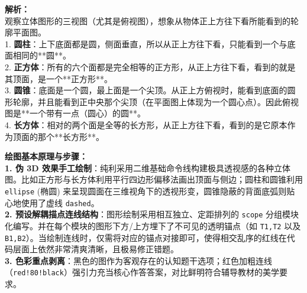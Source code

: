 \begin{center}
\end{center}

\vspace{0.8cm}

{\small\color{gray}
\textbf{解析：}\\
观察立体图形的三视图（尤其是俯视图），想象从物体正上方往下看所能看到的轮廓平面图。\\
1. \textbf{圆柱}：上下底面都是圆，侧面垂直，所以从正上方往下看，只能看到一个与底面相同的**圆**。\\
2. \textbf{正方体}：所有的六个面都是完全相等的正方形，从正上方往下看，看到的就是其顶面，是一个**正方形**。\\
3. \textbf{圆锥}：底面是一个圆，最上面是一个尖顶。从正上方俯视时，能看到底面的圆形轮廓，并且能看到正中央那个尖顶（在平面图上体现为一个圆心点）。因此俯视图是**一个带有一点（圆心）的圆**。\\
4. \textbf{长方体}：相对的两个面是全等的长方形，从正上方往下看，看到的是它原本作为顶面的那个**长方形**。
}

\vspace{0.6cm}

{\small\color{blue!70!black}
\textbf{绘图基本原理与步骤：}\\
\textbf{1. 伪 3D 效果手工绘制}：纯利采用二维基础命令线构建极具透视感的各种立体图。比如正方形与长方体利用平行四边形偏移法画出顶面与侧边；圆柱和圆锥利用 \texttt{ellipse} (椭圆) 来呈现圆面在三维视角下的透视形变，圆锥隐蔽的背面底弧则贴心地使用了虚线 \texttt{dashed}。\\
\textbf{2. 预设解耦描点连线结构}：图形绘制采用相互独立、定距排列的 \texttt{scope} 分组模块化编写。并在每个模块的图形下方/上方埋下了不可见的透明锚点（如 \texttt{T1,T2} 以及 \texttt{B1,B2}）。当绘制连线时，仅需将对应的锚点对接即可，使得相交乱序的红线在代码层面上依然非常清爽清晰，且极易修正错题。\\
\textbf{3. 色彩重点剥离}：黑色的图作为客观存在的认知题干选项；红色加粗连线（\texttt{red!80!black}）强引力充当核心作答答案，对比鲜明符合辅导教材的美学要求。
}


\newpage
